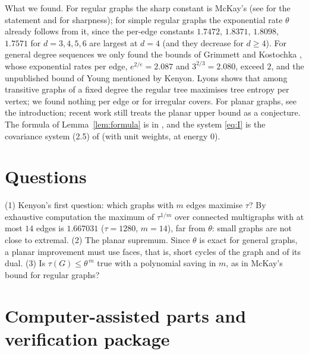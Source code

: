 \documentclass[11pt]{amsart}
\theoremstyle{plain}
\theoremstyle{remark}
\newcommand{\tht}{\theta}
\begin{document}
What we found. For regular graphs the sharp constant is McKay's \cite{McKay} (see \cite{GIKM} for the statement
and \cite{ChungYau} for sharpness); for simple regular graphs the exponential rate $\tht$ already follows from it,
since the per-edge constants $1.7472$, $1.8371$, $1.8098$, $1.7571$ for $d=3,4,5,6$ are largest at $d=4$ (and they
decrease for $d\ge4$). For general
degree sequences we only found the bounds of Grimmett \cite{Grimmett} and Kostochka \cite{Kostochka}, whose
exponential rates per edge, $e^{2/e}=2.087$ and $3^{2/3}=2.080$, exceed $2$, and the unpublished bound of Young
mentioned by Kenyon. Lyons \cite{Lyons} shows that among transitive graphs
of a fixed degree the regular tree maximises tree entropy per vertex; we found nothing per edge or for irregular
covers. For planar graphs, see the introduction; recent work \cite{Burton,CK25} still treats the planar upper
bound as a conjecture. The formula of Lemma~\ref{lem:formula} is in \cite{BBGSS}, and the system \eqref{eq:I}
is the covariance system (2.5) of \cite{Watanabe} (with unit weights, at energy $0$).

\section{Questions}

\textup{(1)} Kenyon's first question: which graphs with $m$ edges maximise $\tau$? By exhaustive computation the
maximum of $\tau^{1/m}$ over connected multigraphs with at most $14$ edges is $1.667031$ ($\tau=1280$, $m=14$), far
from $\tht$: small graphs are not close to extremal.
\textup{(2)} The planar supremum. Since $\tht$ is exact for general graphs, a planar improvement must use faces,
that is, short cycles of the graph and of its dual. \textup{(3)} Is $\tau(G)\le\tht^{\,m}$ true with a
polynomial saving in $m$, as in McKay's bound for regular graphs?

\appendix
\section{Computer-assisted parts and verification package}\label{app:num}
\end{document}
